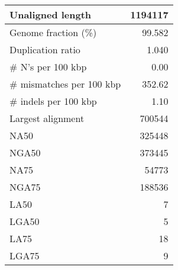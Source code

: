 \documentclass[12pt,a4paper]{article}
\begin{document}
\begin{table}[ht]
\begin{center}
\begin{tabular}{|l*{1}{|r}|}
Unaligned length & 1194117 \\ \hline
Genome fraction (\%) & 99.582 \\ \hline
Duplication ratio & 1.040 \\ \hline
\# N's per 100 kbp & 0.00 \\ \hline
\# mismatches per 100 kbp & 352.62 \\ \hline
\# indels per 100 kbp & 1.10 \\ \hline
Largest alignment & 700544 \\ \hline
NA50 & 325448 \\ \hline
NGA50 & 373445 \\ \hline
NA75 & 54773 \\ \hline
NGA75 & 188536 \\ \hline
LA50 & 7 \\ \hline
LGA50 & 5 \\ \hline
LA75 & 18 \\ \hline
LGA75 & 9 \\ \hline
\end{tabular}
\end{center}
\end{table}
\end{document}
